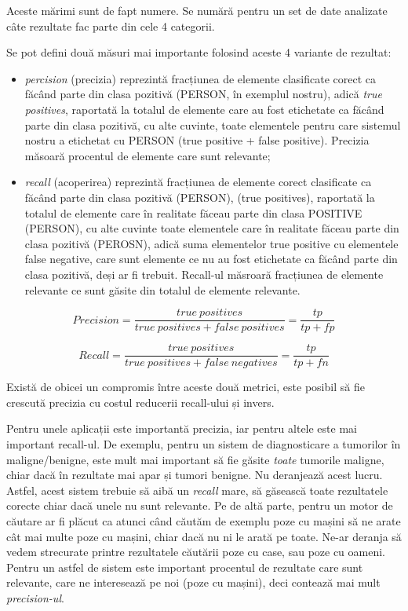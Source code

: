 Aceste mărimi sunt de fapt numere. Se numără pentru un set de date analizate câte rezultate fac parte din cele 4 categorii.

Se pot defini două măsuri mai importante folosind aceste 4 variante de rezultat:

\begin{itemize}
\item \textit{percision} (precizia) reprezintă fracțiunea de elemente clasificate corect ca făcând parte din clasa pozitivă (PERSON, în exemplul nostru), adică \textit{true positives}, raportată la totalul de elemente care au fost etichetate ca făcând parte din clasa pozitivă, cu alte cuvinte, toate elementele pentru care sistemul nostru a etichetat cu PERSON (true positive + false positive). Precizia măsoară procentul de elemente care sunt relevante;

\item \textit{recall} (acoperirea) reprezintă fracțiunea de elemente corect clasificate ca făcând parte din clasa pozitivă (PERSON), (true positives), raportată la totalul de elemente care în realitate făceau parte din clasa POSITIVE (PERSON), cu alte cuvinte toate elementele care în realitate făceau parte din clasa pozitivă (PEROSN), adică suma elementelor true positive cu elementele false negative, care sunt elemente ce nu au fost etichetate ca făcând parte din clasa pozitivă, deși ar fi trebuit. Recall-ul măsroară fracțiunea de elemente relevante ce sunt găsite din totalul de elemente relevante.
\end{itemize}

\begin{equation}
Precision = \frac{true\ positives}{true\ positives + false\ positives} = \frac{tp}{tp + fp}
\end{equation}

\begin{equation}
Recall = \frac{true\ positives}{true\ positives + false\ negatives} = \frac{tp}{tp + fn}
\end{equation}

Există de obicei un compromis între aceste două metrici, este posibil să fie crescută 
precizia cu costul reducerii recall-ului și invers.

Pentru unele aplicații este importantă precizia, iar pentru altele este mai important recall-ul. De exemplu, pentru un sistem de diagnosticare a tumorilor în maligne/benigne, este mult mai important să fie găsite \textit{toate} tumorile maligne, chiar dacă în rezultate mai apar și tumori benigne. Nu deranjează acest lucru. Astfel, acest sistem trebuie să aibă un \textit{recall} mare, să găsească toate rezultatele corecte chiar dacă unele nu sunt relevante. Pe de altă parte, pentru un motor de căutare ar fi plăcut ca atunci când căutăm de exemplu poze cu mașini să ne arate cât mai multe poze cu mașini, chiar dacă nu ni le arată pe toate. Ne-ar deranja să vedem strecurate printre rezultatele căutării poze cu case, sau poze cu oameni. Pentru un astfel de sistem este important procentul de rezultate care sunt relevante, care ne interesează pe noi (poze cu mașini), deci contează mai mult \textit{precision-ul}.

